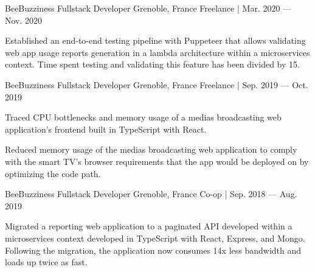 

\begin{cventries}
    \cventry
    {BeeBuzziness} %
    {Fullstack Developer} %
    {Grenoble, France} %
    {Freelance | Mar. 2020 — Nov. 2020} %
    {
    \begin{cvitems} %
        \item {Established an end-to-end testing pipeline with Puppeteer that allows validating web app usage reports generation in a lambda architecture within a microservices context.
        Time spent testing and validating this feature has been divided by 15.}
    \end{cvitems}
    }

    \cventry
    {BeeBuzziness} %
    {Fullstack Developer} %
    {Grenoble, France} %
    {Freelance | Sep. 2019 — Oct. 2019} %
    {
    \begin{cvitems} %
        \item {Traced CPU bottlenecks and memory usage of a medias broadcasting web application's frontend built in TypeScript with React.}
        \item {Reduced memory usage of the medias broadcasting web application to comply with the smart TV's browser requirements that the app would be deployed on by optimizing the code path.}
    \end{cvitems}
    }

    \cventry
    {BeeBuzziness} %
    {Fullstack Developer} %
    {Grenoble, France} %
    {Co-op | Sep. 2018 — Aug. 2019} %
    {
    \begin{cvitems} %
        \item {Migrated a reporting web application to a paginated API developed within a microservices context developed in TypeScript with React, Express, and Mongo.
        Following the migration, the application now consumes 14x less bandwidth and loads up twice as fast.}
    \end{cvitems}
    }


\end{cventries}
